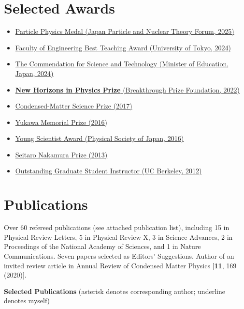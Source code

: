 \documentclass[letterpaper,11pt]{article}
\begin{document}
\section*{Selected Awards}
\begin{itemize}[noitemsep, topsep=3pt]
    \item \href{https://www.ap.t.u-tokyo.ac.jp/info/press/entry-680.html}{Particle Physics Medal (Japan Particle and Nuclear Theory Forum, 2025)}
    \item \href{https://www.t.u-tokyo.ac.jp/en/topics/tp2025-04-04-003}{Faculty of Engineering Best Teaching Award (University of Tokyo, 2024)}
    \item \href{https://www.mext.go.jp/b_menu/houdou/mext_01364.html}{The Commendation for Science and Technology (Minister of Education, Japan, 2024)}
    \item \href{https://breakthroughprize.org/Laureates/1/L3904}{\textbf{New Horizons in Physics Prize} (Breakthrough Prize Foundation, 2022)}
    \item \href{https://cmsp.phys.s.u-tokyo.ac.jp/en/condensed-matter-science-prize/}{Condensed-Matter Science Prize (2017)}
    \item \href{https://w.wiki/Dm9T}{Yukawa Memorial Prize (2016)}
    \item \href{http://www.r8.div.jps.or.jp/past_young_scientist_award.html}{Young Scientist Award (Physical Society of Japan, 2016)}
    \item \href{https://www2.yukawa.kyoto-u.ac.jp/~soryushi.shogakukai/jusho.html}{Seitaro Nakamura Prize (2013)}
    \item \href{https://gsi.berkeley.edu/programs-services/award-programs/ogsi/ogsi-2012/}{Outstanding Graduate Student Instructor (UC Berkeley, 2012)}
\end{itemize}

\section*{Publications}
Over 60 refereed publications (see attached publication list), including 15 in Physical Review Letters, 5 in Physical Review X, 3 in Science Advances, 2 in Proceedings of the National Academy of Sciences, and 1 in Nature Communications.
Seven papers selected as Editors' Suggestions. Author of an invited review article in Annual Review of Condensed Matter Physics [{\bf 11}, 169 (2020)].

\medskip
\noindent\textbf{Selected Publications} {\small (asterisk denotes corresponding author; underline denotes myself)}
\end{document}
